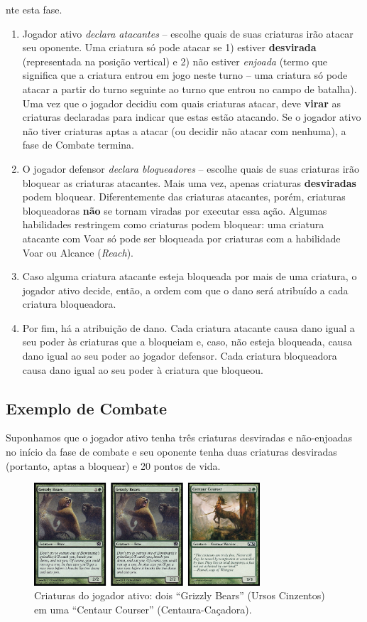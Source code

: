 nte esta fase.

\begin{enumerate}
  \item Jogador ativo \textit{declara atacantes} -- escolhe
quais de suas criaturas irão atacar seu oponente. Uma criatura só pode atacar se 1) estiver \textbf{desvirada} (representada na posição vertical) e 2) não estiver \textit{enjoada} (termo que significa que a criatura entrou em jogo neste turno -- uma criatura só pode atacar a partir do turno seguinte ao turno que entrou no campo de batalha). Uma vez que o jogador decidiu com quais criaturas atacar, deve \textbf{virar} as criaturas declaradas para indicar que estas estão atacando. Se o jogador ativo não tiver criaturas aptas a atacar (ou decidir não atacar com nenhuma), a fase de Combate termina.
    \item O jogador defensor \textit{declara bloqueadores} -- escolhe quais de suas criaturas irão
bloquear as criaturas atacantes. Mais uma vez, apenas criaturas \textbf{desviradas} podem bloquear. Diferentemente das criaturas atacantes, porém, criaturas bloqueadoras \textbf{não} se tornam viradas por executar essa ação. Algumas habilidades restringem como criaturas podem bloquear: uma criatura atacante com Voar só pode ser bloqueada por criaturas com a habilidade Voar ou Alcance (\textit{Reach}).
    \item Caso alguma criatura atacante esteja bloqueada
por mais de uma criatura, o jogador ativo decide, então, a ordem com que o dano será
atribuído a cada criatura bloqueadora.
    \item Por fim, há a atribuição de dano. Cada criatura atacante causa dano igual a seu poder às criaturas que a bloqueiam e, caso, não esteja bloqueada, causa dano igual ao seu poder ao jogador defensor. Cada criatura bloqueadora causa dano igual ao seu poder à criatura que bloqueou.
\end{enumerate}

\subsection{Exemplo de Combate}

Suponhamos que o jogador ativo tenha três criaturas desviradas e não-enjoadas no início da fase de combate e seu oponente tenha duas criaturas desviradas (portanto, aptas a bloquear) e 20 pontos de vida.

\begin{figure}[!h]
  \centering
  \includegraphics[width=0.75\textwidth]{picstcc/att1.png}
  \caption{Criaturas do jogador ativo: dois ``Grizzly Bears'' (Ursos Cinzentos) em uma ``Centaur Courser'' (Centaura-Caçadora).}
  \label{beginattack}
\end{figure}

